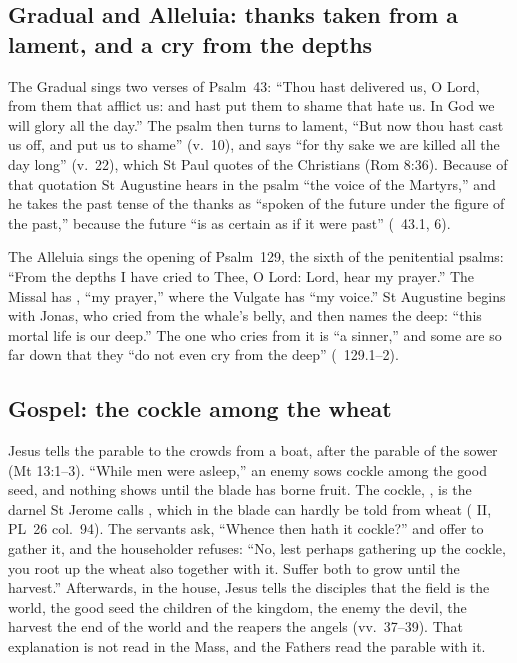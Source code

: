 \subsection{Gradual and Alleluia: thanks taken from a lament, and a cry from the depths}

The Gradual sings two verses of Psalm~43: ``Thou hast delivered us, O Lord,
from them that afflict us: and hast put them to shame that hate us. In God we
will glory all the day.'' The psalm then turns to lament, ``But now thou hast
cast us off, and put us to shame'' (v.~10), and says ``for thy sake we are
killed all the day long'' (v.~22), which St Paul quotes of the Christians (Rom
8:36). Because of that quotation St Augustine hears in the psalm ``the voice
of the Martyrs,'' and he takes the past tense of the thanks as ``spoken of the
future under the figure of the past,'' because the future ``is as certain as if
it were past'' (\ 43.1, 6).

The Alleluia sings the opening of Psalm~129, the sixth of the penitential
psalms: ``From the depths I have cried to Thee, O Lord: Lord, hear my
prayer.'' The Missal has , ``my prayer,'' where the
Vulgate has ``my voice.'' St Augustine begins with Jonas, who cried from the
whale's belly, and then names the deep: ``this mortal life is our deep.'' The
one who cries from it is ``a sinner,'' and some are so far down that they ``do
not even cry from the deep'' (\ 129.1--2).

\subsection{Gospel: the cockle among the wheat}

Jesus tells the parable to the crowds from a boat, after the parable of the
sower (Mt 13:1--3). ``While men were asleep,'' an enemy sows cockle among the
good seed, and nothing shows until the blade has borne fruit. The cockle,
, is the darnel St Jerome calls , which in the
blade can hardly be told from wheat ( II, PL~26 col.~94).
The servants ask, ``Whence then hath it cockle?'' and offer to gather it, and
the householder refuses: ``No, lest perhaps gathering up the cockle, you root
up the wheat also together with it. Suffer both to grow until the harvest.''
Afterwards, in the house, Jesus tells the disciples that the field is the
world, the good seed the children of the kingdom, the enemy the devil, the
harvest the end of the world and the reapers the angels (vv.~37--39). That
explanation is not read in the Mass, and the Fathers read the parable with it.

